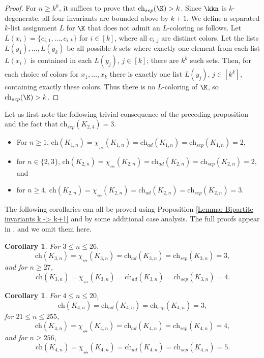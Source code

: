 \documentclass[12pt]{article}
\newtheorem{corollary}[theorem]{Corollary}
\newcommand{\ch}{\mathrm{ch}}
\newcommand{\chsep}{\mathrm{ch}_{sep}}
\newcommand{\chad}{\mathrm{ch}_{ad}}
\newcommand{\sing}{\chi_{\nleftrightarrow}}
\begin{document}
\begin{proof}
    For $n\geq k^k$, it suffices to prove that $\chsep(\K)>k$. Since $\kkn$ is $k$-degenerate, all four invariants are bounded above by $k+1$. We define a separated $k$-list assignment $L$ for $\K$ that does not admit an $L$-coloring as follows. Let $L(x_i)=\{c_{i,1},\dots, c_{i,k}\}$ for $i\in [k]$, where all $c_{i,j}$ are distinct colors. Let the lists $L(y_1),\dots, L(y_k)$ be all possible $k$-sets where exactly one element from each list $L(x_i)$ is contained in each $L(y_j)$, $j\in [k]$; there are $k^k$ such sets. Then, for each choice of colors for $x_1,\dots, x_k$ there is exactly one list $L(y_j)$, $j\in [k^k]$, containing exactly these colors. 
Thus there is no $L$-coloring of $\K$, so $\chsep(\K)>k$. 
\end{proof}

Let us first note the following trivial consequence of the preceding proposition and the fact that
$\chsep(K_{2,4})=3$.


\begin{itemize}

    \item[(i)] For $n\geq 1$, 
$\ch(K_{1,n})=\sing(K_{1,n})=\chad(K_{1,n})=\chsep(K_{1,n})=2,$

\item[(ii)] for $n\in \{2,3\}$,
    $\ch(K_{2,n})=\sing(K_{2,n})=\chad(K_{2,n})=\chsep(K_{2,n})=2,$
    and 

\item[(iii)] for $n\geq 4$, $\ch(K_{2,n})=\sing(K_{2,n})=\chad(K_{2,n})=\chsep(K_{2,n})=3.$

\end{itemize}


	The following corollaries
	can all be proved using Proposition \ref{Lemma: Bipartite invariants k -> k+1} and by some additional
	case analysis. The full proofs appear in \cite{Eriksson}, and we omit them here. 

\begin{corollary}
    For $3\leq n \leq 26$,
    $$
    \ch(K_{3,n})=\sing(K_{3,n})=\chad(K_{3,n})=\chsep(K_{3,n})=3,
    $$
    and for $n\geq 27$,
    $$
    \ch(K_{3,n})=\sing(K_{3,n})=\chad(K_{3,n})=\chsep(K_{3,n})=4.
    $$
\end{corollary}

\begin{corollary}
\label{Proposition: Invariants for K_4,n}
    For $4\leq n\leq 20$,
    $$
    \ch(K_{4,n})=\chad(K_{4,n})=\chsep(K_{4,n})=3,
    $$
    for $21 \leq n\leq 255$,
    $$
    \ch(K_{4,n})=\sing(K_{4,n})=\chad(K_{4,n})=\chsep(K_{4,n})=4, 
    $$
    and for $n\geq 256$,
    $$
    \ch(K_{4,n})=\sing(K_{4,n})=\chad(K_{4,n})=\chsep(K_{4,n})=5.
    $$
\end{corollary}
\end{document}
